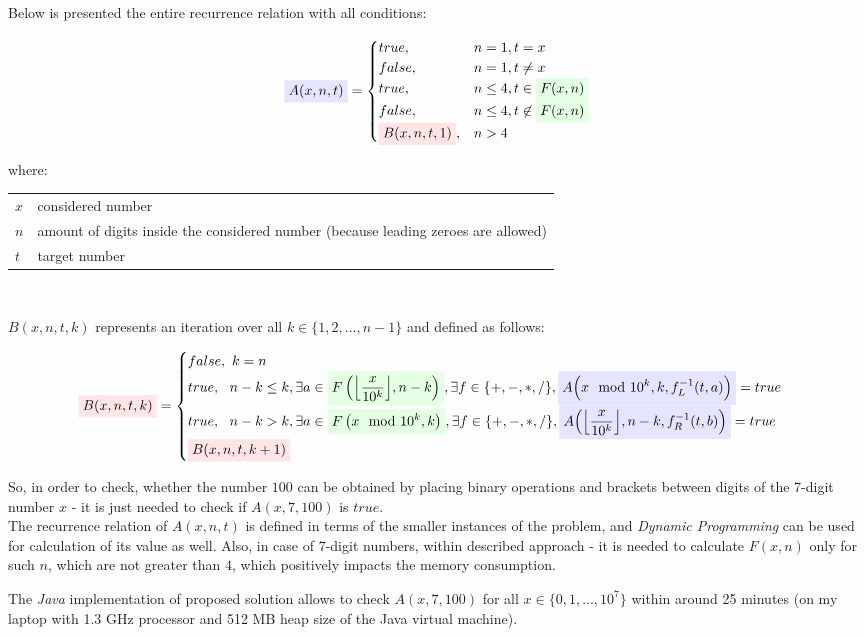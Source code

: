 \documentclass{article}
\makeatletter
\newcommand{\highlight}[1]{\colorbox{green!10}{$\displaystyle#1$}}
\newcommand{\highlightblue}[1]{\colorbox{blue!10}{$\displaystyle#1$}}
\newcommand{\highlightred}[1]{\colorbox{red!10}{$\displaystyle#1$}}
\newenvironment{conditions}[1][where:]
  {#1 \begin{tabular}[t]{>{$}l<{$} @{${} - {}$} l}}
  {\end{tabular}\\[\belowdisplayskip]}
\DeclarePairedDelimiter\floor{\lfloor}{\rfloor}
\makeatother
\begin{document}
Below is presented the entire recurrence relation with all conditions:

\begin{equation}
\begin{split}
	\highlightblue{A(x, n, t)} =
	\begin{cases}
		true, 		& n = 1, t = x \\
		false, 	& n = 1, t \neq x \\
		true,		& n \leq 4, t \in \highlight{F(x, n)} \\
		false,	& n \leq 4, t \not\in \highlight{F(x, n)} \\
		\highlightred{B(x, n, t, 1)}, & n > 4
	\end{cases}
\end{split}
\end{equation}

\begin{conditions} 
	x & considered number \\
	n & amount of digits inside the considered number (because leading zeroes are allowed) \\
	t  & target number
\end{conditions} 

$B(x, n, t, k)$ represents an iteration over all $k \in \{1, 2, ..., n - 1\}$ and defined as follows:

\begin{equation}
\begin{split}
	\highlightred{B(x, n, t, k)} =
	\begin{cases}
		false,\  	k = n \\
		true,\ \  		n - k \leq k, \exists a \in \highlight{F\left(\floor*{x \over 10^k}, n - k\right)}, \exists f \in \{+, -, *, /\}, \highlightblue{A\Big(x \mod 10^k, k, f_L^{-1}(t, a)\Big)} = true \\
		true,\ \  		n - k > k, \exists a \in \highlight{F\left(x \mod 10^k, k\right)}, \exists f \in \{+, -, *, /\}, \highlightblue{A\Big(\floor*{x \over 10^k}, n - k, f_R^{-1}(t, b)\Big)} = true \\
		\highlightred{B(x, n, t, k + 1)}
	\end{cases}
\end{split}
\end{equation}

So, in order to check, whether the number $100$ can be obtained by placing binary operations and brackets between digits of the 7-digit number $x$ - it is just needed to check if $A(x, 7, 100)$ is $true$. \\

The recurrence relation of $A(x, n, t)$ is defined in terms of the smaller instances of the problem, and \textit{Dynamic Programming} can be used for calculation of its value as well. Also, in case of $7$-digit numbers, within described approach - it is needed to calculate $F(x, n)$ only for such $n$, which are not greater than $4$, which positively impacts the memory consumption.

The \textit{Java} implementation of proposed solution allows to check $A(x, 7, 100)$ for all $x \in \{0, 1, ... , 10^7 \}$ within around 25 minutes (on my laptop with 1.3 GHz processor and 512 MB heap size of the Java virtual machine).
\end{document}
